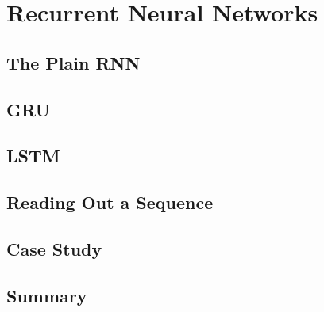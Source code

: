 \section[RNN]{Recurrent Neural Networks}
\subsection{The Plain RNN}

\subsection{GRU}

\subsection{LSTM}

\subsection{Reading Out a Sequence}

\subsection{Case Study}

\subsection{Summary}

% 

